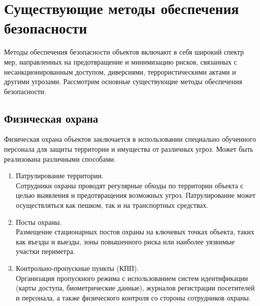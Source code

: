 \section{Существующие методы обеспечения безопасности} \label{ch1:sec2} 

Методы обеспечения безопасности объектов включают в себя широкий спектр мер, направленных на предотвращение и минимизацию рисков, связанных с несанкционированным доступом, диверсиями, террористическими актами и другими угрозами. Рассмотрим основные существующие методы обеспечения безопасности.

\subsection{Физическая охрана}
Физическая охрана объектов заключается в использовании специально обученного персонала для защиты территории и имущества от различных угроз. Может быть реализована различными способами.
\begin{enumerate}[1.]
    \item Патрулирование территории. \\
    Сотрудники охраны проводят регулярные обходы по территории объекта с целью выявления и предотвращения возможных угроз. Патрулирование может осуществляться как пешком, так и на транспортных средствах.
    \item Посты охраны. \\
    Размещение стационарных постов охраны на ключевых точках объекта, таких как въезды и выезды, зоны повышенного риска или наиболее уязвимые участки периметра. 
    \item Контрольно-пропускные пункты (КПП). \\
    Организация пропускного режима с использованием систем идентификации (карты доступа, биометрические данные), журналов регистрации посетителей и персонала, а также физического контроля со стороны сотрудников охраны.
\end{enumerate}
